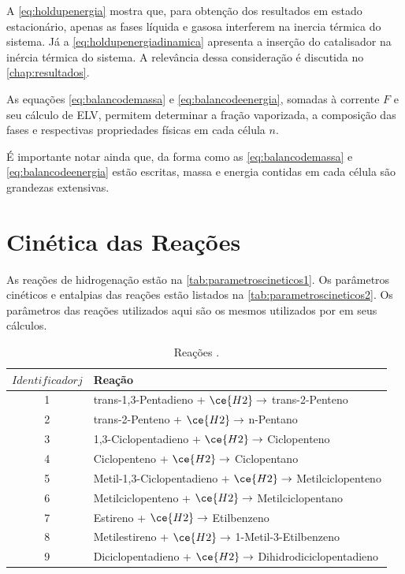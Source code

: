 A \autoref{eq:holdupenergia} mostra que, para obtenção dos resultados em estado
estacionário, apenas as fases líquida e gasosa interferem na inercia térmica do
sistema. Já a \autoref{eq:holdupenergiadinamica} apresenta a inserção do
catalisador na inércia térmica do sistema. A relevância dessa consideração é
discutida no \autoref{chap:resultados}.


As equações \ref{eq:balancodemassa} e \ref{eq:balancodeenergia}, somadas
à corrente $F$ e seu cálculo de ELV, permitem determinar a fração vaporizada,
a composição das fases e respectivas propriedades físicas em cada célula $n$.

É importante notar ainda que, da forma como as \autoref{eq:balancodemassa} e
\autoref{eq:balancodeenergia} estão escritas, massa e energia contidas em cada
célula são grandezas extensivas. 

\section{Cinética das Reações} \label{sec:cineticadasreacoes}

As reações de hidrogenação estão na \autoref{tab:parametroscineticos1}. Os
parâmetros cinéticos e entalpias das reações estão listados na
\autoref{tab:parametroscineticos2}. Os parâmetros das reações utilizados aqui
são os mesmos utilizados por  em seus cálculos.

\begin{table}[!htb]
\begin{center}
\caption{Reações \cite{Rojas2014a}.}
\label{tab:parametroscineticos1}
\small
\begin{tabular}{cl}
{$Identificador j$} & {Reação} \\
\hline
1 & trans-1,3-Pentadieno + $\ce{H2} \rightarrow$ trans-2-Penteno \\
2 & trans-2-Penteno + $\ce{H2} \rightarrow$ n-Pentano \\
3 & 1,3-Ciclopentadieno + $\ce{H2} \rightarrow$ Ciclopenteno \\
4 & Ciclopenteno + $\ce{H2} \rightarrow$ Ciclopentano \\
5 & Metil-1,3-Ciclopentadieno + $\ce{H2} \rightarrow$ Metilciclopenteno \\
6 & Metilciclopenteno + $\ce{H2} \rightarrow$ Metilciclopentano \\
7 & Estireno + $\ce{H2} \rightarrow$ Etilbenzeno \\
8 & Metilestireno + $\ce{H2} \rightarrow$ 1-Metil-3-Etilbenzeno \\
9 & Diciclopentadieno + $\ce{H2} \rightarrow$ Dihidrodiciclopentadieno \\
\bottomrule
\end{tabular}
\end{center}
\end{table} 

